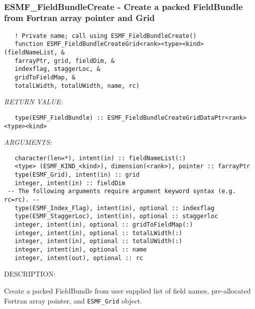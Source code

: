  
\mbox{}\hrulefill\ 
 
\subsubsection [ESMF\_FieldBundleCreate] {ESMF\_FieldBundleCreate - Create a packed FieldBundle from Fortran array pointer and Grid }


   
\begin{verbatim}   ! Private name; call using ESMF_FieldBundleCreate() 
   function ESMF_FieldBundleCreateGrid<rank><type><kind>(fieldNameList, & 
   farrayPtr, grid, fieldDim, & 
   indexflag, staggerLoc, & 
   gridToFieldMap, & 
   totalLWidth, totalUWidth, name, rc) 
   \end{verbatim}{\em RETURN VALUE:}
\begin{verbatim}   type(ESMF_FieldBundle) :: ESMF_FieldBundleCreateGridDataPtr<rank><type><kind> 
   \end{verbatim}{\em ARGUMENTS:}
\begin{verbatim}   character(len=*), intent(in) :: fieldNameList(:) 
   <type> (ESMF_KIND_<kind>), dimension(<rank>), pointer :: farrayPtr 
   type(ESMF_Grid), intent(in) :: grid 
   integer, intent(in) :: fieldDim 
 -- The following arguments require argument keyword syntax (e.g. rc=rc). --
   type(ESMF_Index_Flag), intent(in), optional :: indexflag 
   type(ESMF_StaggerLoc), intent(in), optional :: staggerloc 
   integer, intent(in), optional :: gridToFieldMap(:) 
   integer, intent(in), optional :: totalLWidth(:) 
   integer, intent(in), optional :: totalUWidth(:) 
   integer, intent(in), optional :: name 
   integer, intent(out), optional :: rc 
   \end{verbatim}
{\sf DESCRIPTION:\\ }

 
   Create a packed FieldBundle from user supplied list of field names, pre-allocated 
   Fortran array pointer, and {\tt ESMF\_Grid} object. 
   
